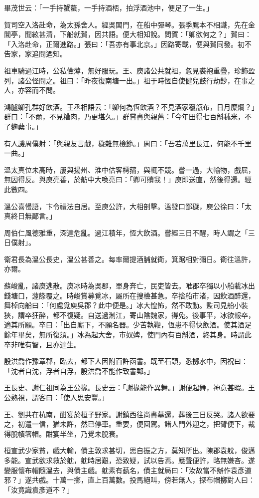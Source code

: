 畢茂世云：「一手持蟹螯，一手持酒桮，拍浮酒池中，便足了一生。」

賀司空入洛赴命，為太孫舍人。經吳閶門，在船中彈琴。張季鷹本不相識，先在金閶亭，聞絃甚清，下船就賀，因共語。便大相知說。問賀：「卿欲何之？」賀曰：「入洛赴命，正爾進路。」張曰：「吾亦有事北京。」因路寄載，便與賀同發。初不告家，家追問迺知。

祖車騎過江時，公私儉薄，無好服玩。王、庾諸公共就祖，忽見裘袍重疊，珍飾盈列，諸公怪問之。祖曰：「昨夜復南塘一出。」祖于時恆自使健兒鼓行劫鈔，在事之人，亦容而不問。

鴻臚卿孔群好飲酒。王丞相語云：「卿何為恆飲酒？不見酒家覆瓿布，日月糜爛？」群曰：「不爾，不見糟肉，乃更堪久。」群嘗書與親舊：「今年田得七百斛秫米，不了麴蘖事。」

有人譏周僕射：「與親友言戲，穢雜無檢節。」周曰：「吾若萬里長江，何能不千里一曲。」

溫太真位未高時，屢與揚州、淮中估客樗蒱，與輒不競。嘗一過，大輸物，戲屈，無因得反。與庾亮善，於舫中大喚亮曰：「卿可贖我！」庾即送直，然後得還。經此數四。

溫公喜慢語，卞令禮法自居。至庾公許，大相剖擊。溫發口鄙穢，庾公徐曰：「太真終日無鄙言。」

周伯仁風德雅重，深達危亂。過江積年，恆大飲酒。嘗經三日不醒，時人謂之「三日僕射」。

衛君長為溫公長史，溫公甚善之。每率爾提酒脯就衛，箕踞相對彌日。衛往溫許，亦爾。

蘇峻亂，諸庾逃散。庾冰時為吳郡，單身奔亡，民吏皆去。唯郡卒獨以小船載冰出錢塘口，蘧篨覆之。時峻賞募覓冰，屬所在搜檢甚急。卒捨船市渚，因飲酒醉還，舞棹向船曰：「何處覓庾吳郡？此中便是。」冰大惶怖，然不敢動。監司見船小裝狹，謂卒狂醉，都不復疑。自送過淛江，寄山陰魏家，得免。後事平，冰欲報卒，適其所願。卒曰：「出自廝下，不願名器。少苦執鞭，恆患不得快飲酒。使其酒足餘年畢矣，無所復須。」冰為起大舍，市奴婢，使門內有百斛酒，終其身。時謂此卒非唯有智，且亦達生。

殷洪喬作豫章郡，臨去，都下人因附百許函書。既至石頭，悉擲水中，因祝曰：「沈者自沈，浮者自浮，殷洪喬不能作致書郵。」

王長史、謝仁祖同為王公掾。長史云：「謝掾能作異舞。」謝便起舞，神意甚暇。王公熟視，謂客曰：「使人思安豐。」

王、劉共在杭南，酣宴於桓子野家。謝鎮西往尚書墓還，葬後三日反哭。諸人欲要之，初遣一信，猶未許，然已停車。重要，便回駕。諸人門外迎之，把臂便下，裁得脫幘箸帽。酣宴半坐，乃覺未脫衰。

桓宣武少家貧，戲大輸，債主敦求甚切，思自振之方，莫知所出。陳郡袁躭，俊邁多能。宣武欲求救於躭，躭時居艱，恐致疑，試以告焉。應聲便許，略無嫌吝。遂變服懷布帽隨溫去，與債主戲。躭素有蓺名，債主就局曰：「汝故當不辦作袁彥道邪？」遂共戲。十萬一擲，直上百萬數。投馬絕叫，傍若無人，探布帽擲對人曰：「汝竟識袁彥道不？」

